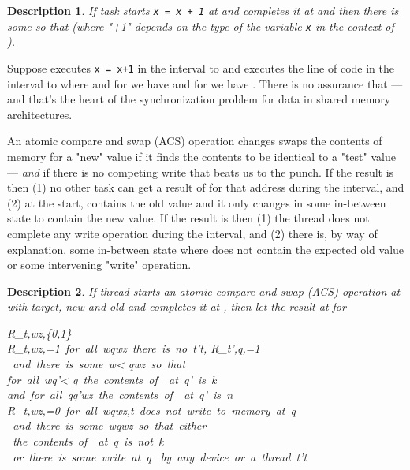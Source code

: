 \documentclass[english,11pt]{article}
\newtheorem{expl}{Description}[section]
\newcommand{\set}[1]{\{#1\}}
\newcommand{\Beq}{}
\begin{document}
\begin{expl}
If task  starts {\tt x = x + 1} at  and completes it at  and
 then there is some  so 
that 
(where "+1" depends  on the type of the variable
{\tt x} in the context of ).
\end{expl}

Suppose  executes {\tt x = x+1} in the interval  to  and
 executes the line of code in the interval  to  where 
 and for  we have
  and for  we have
. There is no assurance that
 --- and that's the heart of the
synchronization problem for data in shared memory architectures.

An atomic
compare and swap (ACS) operation changes swaps the contents of memory for a "new" value if it finds the contents to be identical to a "test" value --- {\em and } if 
there is no competing write that beats us to the punch. If the
result is  then (1) no other task can get a result of  for that
address during the interval, and (2) at the start,  contains the
old value and it only changes in some in-between state to contain the new
value. If the result is  then (1) the thread does not complete any
write operation during the interval, and (2) there is, by way of
explanation, some in-between state where  does not 
contain the expected old value or some intervening "write" operation.
\begin{expl}
If thread  starts an atomic compare-and-swap (ACS) operation at   with target, new and old and completes it at , then
let  the result at  for 
\Beq
R_{t,wz,\alpha}\in\set{0,1}\\
R_{t,wz,\alpha}=1\rightarrow \mbox{ for all }w\leq q\leq wz\mbox{ there is no }t'\neq t, R_{t',q,\alpha}=1\nonumber\\
\mbox{ and there is some }w< q\leq wz\mbox{ so that } \nonumber\\
\mbox{for all }w\leq q'< q\mbox{ the contents of }\alpha\mbox{ at }q'\mbox{ is }k\nonumber\\
\mbox{and for all }q\leq q'\leq wz\mbox{ the contents of }\alpha\mbox{ at }q'\mbox{ is }n\\
R_{t,wz,\alpha}=0\rightarrow \mbox{ for all  }w\leq q\leq wz,t\mbox{ does not write to memory at }q\nonumber\\
\mbox{ and there is some }w\leq q\leq wz\mbox{ so that either} \\
\mbox{ the contents of }\alpha\mbox{ at }q\mbox{ is not }k\nonumber\\
\mbox{ or there is some write at }q \mbox{ by any device or a thread }t'\neq t
\Eeq
\end{expl}
\end{document}
